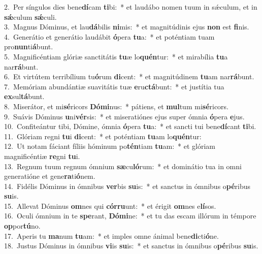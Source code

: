 {2.~}Per síngulos dies bene\textbf{dí}cam \textbf{ti}bi:~* et laudábo nomen tuum in sǽculum, et in \textbf{sǽ}culum \textbf{sǽ}culi.\\
{3.~}Magnus Dóminus, et lau\textbf{dá}bilis \textbf{ni}mis:~* et magnitúdinis ejus \textbf{non} est \textbf{fi}nis.\\
{4.~}Generátio et generátio laudábit \textbf{ó}pera \textbf{tu}a:~* et poténtiam tuam pro\textbf{nun}ti\textbf{á}bunt.\\
{5.~}Magnificéntiam glóriæ sanctitátis \textbf{tu}æ lo\textbf{quén}tur:~* et mirabília \textbf{tu}a nar\textbf{rá}bunt.\\
{6.~}Et virtútem terribílium tu\textbf{ó}rum \textbf{di}cent:~* et magnitúdinem \textbf{tu}am nar\textbf{rá}bunt.\\
{7.~}Memóriam abundántiæ suavitátis tuæ \textbf{e}ru\textbf{ctá}bunt:~* et justítia tua \textbf{ex}sul\textbf{tá}bunt.\\
{8.~}Miserátor, et mi\textbf{sé}ricors \textbf{Dó}\textbf{mi}nus:~* pátiens, et \textbf{mul}tum mi\textbf{sé}ricors.\\
{9.~}Suávis Dóminus \textbf{u}ni\textbf{vér}sis:~* et miseratiónes ejus super ómnia \textbf{ó}pera \textbf{e}jus.\\
{10.~}Confiteántur tibi, Dómine, ómnia \textbf{ó}pera \textbf{tu}a:~* et sancti tui bene\textbf{dí}cant \textbf{ti}bi.\\
{11.~}Glóriam regni \textbf{tu}i \textbf{di}cent:~* et poténtiam \textbf{tu}am lo\textbf{quén}tur:\\
{12.~}Ut notam fáciant fíliis hóminum po\textbf{tén}tiam \textbf{tu}am:~* et glóriam magnificéntiæ \textbf{re}gni \textbf{tu}i.\\
{13.~}Regnum tuum regnum ómnium \textbf{sæ}cu\textbf{ló}rum:~* et dominátio tua in omni generatióne et gene\textbf{ra}ti\textbf{ó}nem.\\
{14.~}Fidélis Dóminus in ómnibus \textbf{ver}bis \textbf{su}is:~* et sanctus in ómnibus o\textbf{pé}ribus \textbf{su}is.\\
{15.~}Allevat Dóminus \textbf{om}nes qui \textbf{cór}\textbf{ru}unt:~* et érigit \textbf{om}nes e\textbf{lí}sos.\\
{16.~}Oculi ómnium in te \textbf{spe}rant, \textbf{Dó}\textbf{mi}ne:~* et tu das escam illórum in témpore \textbf{op}por\textbf{tú}no.\\
{17.~}Aperis tu \textbf{ma}num \textbf{tu}am:~* et imples omne ánimal bene\textbf{di}cti\textbf{ó}ne.\\
{18.~}Justus Dóminus in ómnibus \textbf{vi}is \textbf{su}is:~* et sanctus in ómnibus o\textbf{pé}ribus \textbf{su}is.\\
